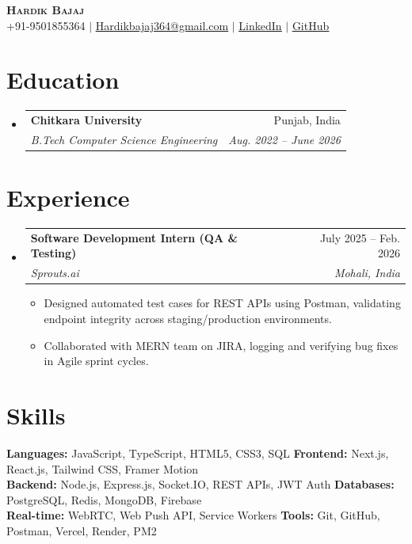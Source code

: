 \documentclass[letterpaper,10pt]{article}
\makeatletter
\newcommand{\resumeItem}[1]{
  \item\footnotesize{#1 \vspace{-2pt}}
}
\newcommand{\resumeSubheading}[4]{
  \vspace{-2pt}\item
    \begin{tabular*}{0.97\textwidth}[t]{l@{\extracolsep{\fill}}r}
      \textbf{\small#1} & \small#2 \\
      \textit{\footnotesize#3} & \textit{\footnotesize#4} \\
    \end{tabular*}\vspace{-6pt}
}
\newcommand{\resumeSubHeadingListStart}{\begin{itemize}[leftmargin=0.15in, label={}]}
\newcommand{\resumeSubHeadingListEnd}{\end{itemize}}
\newcommand{\resumeItemListStart}{\begin{itemize}[leftmargin=0.15in]}
\newcommand{\resumeItemListEnd}{\end{itemize}\vspace{-4pt}}
\makeatother
\begin{document}
\begin{center}
    \textbf{\Large \scshape Hardik Bajaj} \vspace{-2pt}\\
    \footnotesize +91-9501855364 $|$
    \href{mailto:Hardikbajaj364@gmail.com}{\underline{Hardikbajaj364@gmail.com}} $|$
    \href{https://www.linkedin.com/in/hardikbajaj364}{\underline{LinkedIn}} $|$
    \href{https://github.com/Hardik364}{\underline{GitHub}}
\end{center}\vspace{-8pt}

\section{Education}
  \resumeSubHeadingListStart
    \resumeSubheading
      {Chitkara University}{Punjab, India}
      {B.Tech Computer Science Engineering}{Aug. 2022 -- June 2026}
  \resumeSubHeadingListEnd

\section{Experience}
  \resumeSubHeadingListStart
    \resumeSubheading
      {Software Development Intern (QA \& Testing)}{July 2025 -- Feb. 2026}
      {Sprouts.ai}{Mohali, India}
      \resumeItemListStart
        \resumeItem{Designed automated test cases for REST APIs using Postman, validating endpoint integrity across staging/production environments.}
        \resumeItem{Collaborated with MERN team on JIRA, logging and verifying bug fixes in Agile sprint cycles.}
      \resumeItemListEnd
  \resumeSubHeadingListEnd

\section{Skills}
\begin{itemize}[leftmargin=0.15in, label={}]
    \footnotesize{\item{
        \textbf{Languages:} JavaScript, TypeScript, HTML5, CSS3, SQL \quad \textbf{Frontend:} Next.js, React.js, Tailwind CSS, Framer Motion \\
        \textbf{Backend:} Node.js, Express.js, Socket.IO, REST APIs, JWT Auth \quad \textbf{Databases:} PostgreSQL, Redis, MongoDB, Firebase \\
        \textbf{Real-time:} WebRTC, Web Push API, Service Workers \quad \textbf{Tools:} Git, GitHub, Postman, Vercel, Render, PM2
    }}
\end{itemize}\vspace{-4pt}
\end{document}
